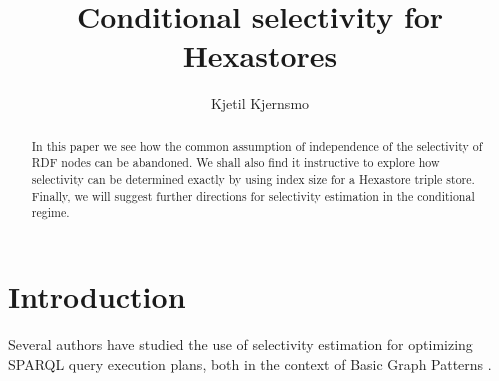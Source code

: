 \documentclass[12pt]{article}
\title{Conditional selectivity for Hexastores}
\author{Kjetil Kjernsmo}
\begin{document}
\maketitle

\begin{abstract}
In this paper we see how the common assumption of independence of the
selectivity of RDF nodes can be abandoned. We shall also find it
instructive to explore how selectivity can be determined exactly by
using index size for a Hexastore triple store. Finally, we will
suggest further directions for selectivity estimation in the
conditional regime.

\end{abstract}

\section{Introduction}
Several authors have studied the use of selectivity estimation for
optimizing SPARQL query execution plans, both in the context of Basic
Graph Patterns \cite{Stocker:2008:SBG:1367497.1367578}.



{}

\end{document}
